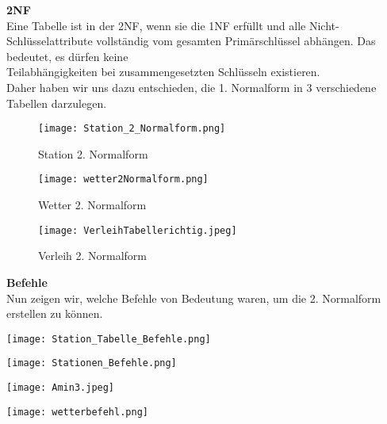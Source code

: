 \documentclass[a4paper,12pt]{article}
\begin{document}
\textbf{2NF}\\Eine Tabelle ist in der 2NF, wenn sie die 1NF erfüllt und alle Nicht-Schlüsselattribute vollständig vom gesamten Primärschlüssel abhängen. Das bedeutet, es dürfen keine \\Teilabhängigkeiten bei zusammengesetzten Schlüsseln existieren.\\Daher haben wir uns dazu entschieden, die 1. Normalform in 3 verschiedene Tabellen darzulegen.
\begin{center}
    
 \begin{figure}[h!]
    \centering
    \texttt{[image: Station\_2\_Normalform.png]} 
    \caption{Station 2. Normalform } 
    \label{fig:bildname} 
\end{figure}

\begin{figure}[h!]
    \centering
    \texttt{[image: wetter2Normalform.png]} 
    \caption{Wetter 2. Normalform } 
    \label{fig:bildname} 
\end{figure}

\begin{figure}[h!]
    \centering
    \texttt{[image: VerleihTabellerichtig.jpeg]} 
    \caption{Verleih 2. Normalform } 
    \label{fig:bildname} 
\end{figure} 
\end{center}
\textbf{Befehle}\\Nun zeigen wir, welche Befehle von Bedeutung waren, um die 2. Normalform erstellen zu können.

 
  \begin{minipage}{0.45\textwidth}
        \centering
        \texttt{[image: Station\_Tabelle\_Befehle.png]}
    \end{minipage} \hspace{0.5cm}
    \begin{minipage}{0.6\textwidth}
        \centering
        \texttt{[image: Stationen\_Befehle.png]}
    \end{minipage}




 \begin{minipage}{0.45\textwidth}
        \centering
        \texttt{[image: Amin3.jpeg]}
    \end{minipage} \hspace{0.5cm}
    \begin{minipage}{0.6\textwidth}
        \centering
        \texttt{[image: wetterbefehl.png]}
    \end{minipage}
\end{document}
